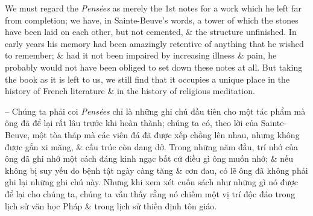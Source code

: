 \documentclass{article}
\begin{document}
\begin{enumerate}
\begin{itemize}
		We must regard the {\it Pens\'ees} as merely the 1st notes for a work which he left far from completion; we have, in Sainte-Beuve's words, a tower of which the stones have been laid on each other, but not cemented, \& the structure unfinished. In early years his memory had been amazingly retentive of anything that he wished to remember; \& had it not been impaired by increasing illness \& pain, he probably would not have been obliged to set down these notes at all. But taking the book as it is left to us, we still find that it occupies a unique place in the history of French literature \& in the history of religious meditation.
		
		-- Chúng ta phải coi {\it Pens\'ees} chỉ là những ghi chú đầu tiên cho một tác phẩm mà ông đã để lại rất lâu trước khi hoàn thành; chúng ta có, theo lời của Sainte-Beuve, một tòa tháp mà các viên đá đã được xếp chồng lên nhau, nhưng không được gắn xi măng, \& cấu trúc còn dang dở. Trong những năm đầu, trí nhớ của ông đã ghi nhớ một cách đáng kinh ngạc bất cứ điều gì ông muốn nhớ; \& nếu không bị suy yếu do bệnh tật ngày càng tăng \& cơn đau, có lẽ ông đã không phải ghi lại những ghi chú này. Nhưng khi xem xét cuốn sách như những gì nó được để lại cho chúng ta, chúng ta vẫn thấy rằng nó chiếm một vị trí độc đáo trong lịch sử văn học Pháp \& trong lịch sử thiền định tôn giáo.
		

\end{itemize}
\end{enumerate}
\end{document}
